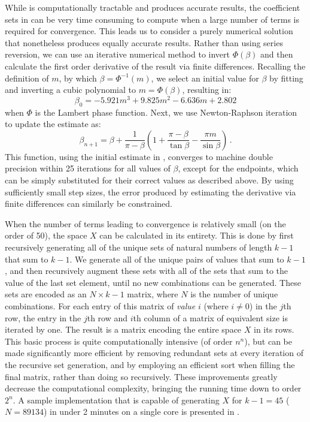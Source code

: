 While  is computationally tractable and produces accurate results, the coefficient sets in  can be very time consuming to compute when a large number of terms is required for convergence.  This leads us to consider a purely numerical solution that nonetheless produces equally accurate results.  Rather than using series reversion, we can use an iterative numerical method to invert $\Phi(\beta)$ and then calculate the first order derivative of the result via finite differences.  Recalling the definition of $m$, by which $\beta = \Phi^{-1}(m)$, we select an initial value for $\beta$ by fitting and inverting a cubic polynomial to $m = \Phi(\beta)$, resulting in:
\begin{equation}\label{eq:betaCubicEst}
\beta_0 = -5.921m^3+ 9.825m^2 - 6.636m + 2.802
\end{equation}
when $\Phi$ is the Lambert phase function.  Next, we use Newton-Raphson iteration to update the estimate as:
\begin{equation}
\beta_{n+1} = \beta + \frac{1}{\pi - \beta}\left(1 + \frac{\pi - \beta}{\tan\beta}  -  \frac{\pi m}{\sin\beta}\right) \,.
\end{equation}
This function, using the initial estimate in , converges to machine double precision within 25 iterations for all values of $\beta$, except for the endpoints, which can be simply substituted for their correct values as described above.  By using sufficiently small step sizes, the error produced by estimating the derivative via finite differences can similarly be constrained.

When the number of terms leading to convergence is relatively small (on the order of 50), the space $X$ can be calculated in its entirety.  This is done by first recursively generating all of the unique sets of natural numbers of length $k-1$ that sum to $k-1$.   We generate all of the unique pairs of values that sum to $k-1$, and then recursively augment these sets with all of the sets that sum to the value of the last set element, until no new combinations can be generated.  These sets are encoded as an $N \times k-1$ matrix, where $N$ is the number of unique combinations. For each  entry of this matrix of \emph{value} $i$ (where $i \ne 0$) in the $j$th row, the entry in the $j$th row and $i$th column of a matrix of equivalent size is iterated by one.  The result is a matrix encoding the entire space $X$ in its rows.  This basic process is quite computationally intensive (of order $n^n$), but can be made significantly more efficient by removing redundant sets at every iteration of the recursive set generation, and by employing an efficient sort when filling the final matrix, rather than doing so recursively.  These improvements greatly decrease the computational complexity, bringing the running time down to order $2^n$.  A sample implementation that is capable of generating $X$ for $k-1 = 45$ ($N = 89134$) in under 2 minutes on a single core is presented in .


